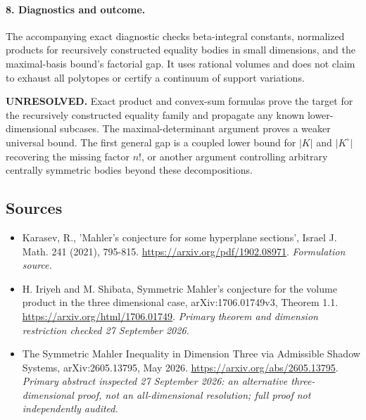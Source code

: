 \documentclass[11pt]{article}
\begin{document}
\paragraph{8. Diagnostics and outcome.}
The accompanying exact diagnostic checks beta-integral constants, normalized products for recursively constructed equality bodies in small dimensions, and the maximal-basis bound's factorial gap. It uses rational volumes and does not claim to exhaust all polytopes or certify a continuum of support variations.

\textbf{UNRESOLVED.} Exact product and convex-sum formulas prove the target for the recursively constructed equality family and propagate any known lower-dimensional subcases. The maximal-determinant argument proves a weaker universal bound. The first general gap is a coupled lower bound for $|K|$ and $|K^\circ|$ recovering the missing factor $n!$, or another argument controlling arbitrary centrally symmetric bodies beyond these decompositions.

\subsection{Sources}
\begin{itemize}
\item[S1]Karasev, R., 'Mahler's conjecture for some hyperplane sections', Israel J. Math. 241 (2021), 795-815.
\url{https://arxiv.org/pdf/1902.08971}.
\textit{Formulation source.}
\item[E1]H. Iriyeh and M. Shibata, Symmetric Mahler's conjecture for the volume product in the three dimensional case, arXiv:1706.01749v3, Theorem 1.1.
\url{https://arxiv.org/html/1706.01749}.
\textit{Primary theorem and dimension restriction checked 27 September 2026.}
\item[E2]The Symmetric Mahler Inequality in Dimension Three via Admissible Shadow Systems, arXiv:2605.13795, May 2026.
\url{https://arxiv.org/abs/2605.13795}.
\textit{Primary abstract inspected 27 September 2026: an alternative three-dimensional proof, not an all-dimensional resolution; full proof not independently audited.}
\end{itemize}
\end{document}
